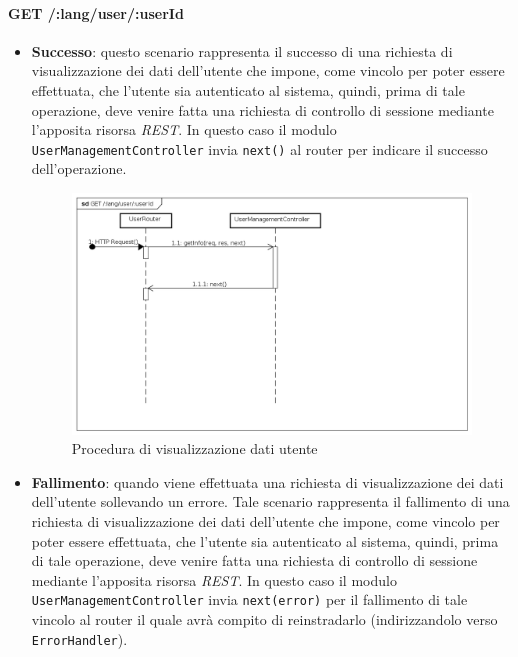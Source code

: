 \paragraph{GET /:lang/user/:userId}
\begin{itemize}
\item \textbf{Successo}: questo scenario rappresenta il successo di una richiesta di visualizzazione dei dati dell'utente che impone, come vincolo per poter essere effettuata, che l'utente sia autenticato al sistema, quindi, prima di tale operazione, deve venire fatta una richiesta di controllo di sessione mediante l'apposita risorsa \textit{REST}.  
In questo caso il modulo \texttt{UserManagementController} invia \texttt{next()} al router per indicare il successo dell'operazione.

\label{Procedura di visualizzazione dati utente}
\begin{figure}[ht]
	\centering
	\includegraphics[scale=0.40]{UML/DiagrammiDiSequenza/Back-end/GET_LangUserUserIdSuccess.png}
	\caption{Procedura di visualizzazione dati utente}
\end{figure}

\FloatBarrier

\item \textbf{Fallimento}: quando viene effettuata una richiesta di visualizzazione dei dati dell'utente sollevando un errore. Tale scenario rappresenta il fallimento di una richiesta di visualizzazione dei dati dell'utente che impone, come vincolo per poter essere effettuata, che l'utente sia autenticato al sistema, quindi, prima di tale operazione, deve venire fatta una richiesta di controllo di sessione mediante l'apposita risorsa \textit{REST}. In questo caso il modulo \texttt{UserManagementController} invia \texttt{next(error)} per il fallimento di tale vincolo al router il quale avrà compito di reinstradarlo (indirizzandolo verso \texttt{ErrorHandler}).


\end{itemize}
